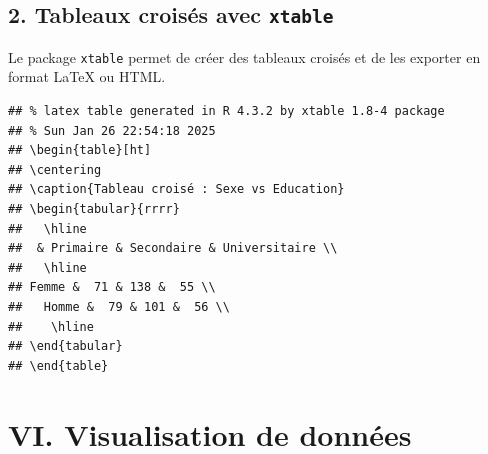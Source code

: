 \documentclass[
]{article}
\newenvironment{Shaded}{\begin{snugshade}}{\end{snugshade}}
\newcommand{\AttributeTok}[1]{\textcolor[rgb]{0.13,0.29,0.53}{#1}}
\newcommand{\CommentTok}[1]{\textcolor[rgb]{0.56,0.35,0.01}{\textit{#1}}}
\newcommand{\ConstantTok}[1]{\textcolor[rgb]{0.56,0.35,0.01}{#1}}
\newcommand{\FunctionTok}[1]{\textcolor[rgb]{0.13,0.29,0.53}{\textbf{#1}}}
\newcommand{\NormalTok}[1]{#1}
\newcommand{\OtherTok}[1]{\textcolor[rgb]{0.56,0.35,0.01}{#1}}
\newcommand{\SpecialCharTok}[1]{\textcolor[rgb]{0.81,0.36,0.00}{\textbf{#1}}}
\newcommand{\StringTok}[1]{\textcolor[rgb]{0.31,0.60,0.02}{#1}}
\begin{document}
\hypertarget{tableaux-croisuxe9s-avec-xtable}{%
\subsection{\texorpdfstring{2. Tableaux croisés avec
\texttt{xtable}}{2. Tableaux croisés avec xtable}}\label{tableaux-croisuxe9s-avec-xtable}}

Le package \texttt{xtable} permet de créer des tableaux croisés et de
les exporter en format LaTeX ou HTML.

\begin{Shaded}
\end{Shaded}

\begin{verbatim}
## % latex table generated in R 4.3.2 by xtable 1.8-4 package
## % Sun Jan 26 22:54:18 2025
## \begin{table}[ht]
## \centering
## \caption{Tableau croisé : Sexe vs Education} 
## \begin{tabular}{rrrr}
##   \hline
##  & Primaire & Secondaire & Universitaire \\ 
##   \hline
## Femme &  71 & 138 &  55 \\ 
##   Homme &  79 & 101 &  56 \\ 
##    \hline
## \end{tabular}
## \end{table}
\end{verbatim}

\hypertarget{vi.-visualisation-de-donnuxe9es}{%
\section{VI. Visualisation de
données}\label{vi.-visualisation-de-donnuxe9es}}
\end{document}
